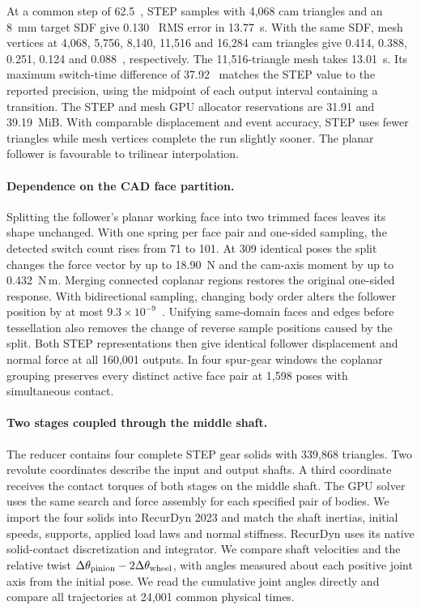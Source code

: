 At a common step of 62.5~\microsec{}, STEP samples with 4,068 cam triangles and an 8~mm target SDF give 0.130~\micron{} RMS error in 13.77~s. With the same SDF, mesh vertices at 4,068, 5,756, 8,140, 11,516 and 16,284 cam triangles give 0.414, 0.388, 0.251, 0.124 and 0.088~\micron{}, respectively. The 11,516-triangle mesh takes 13.01~s. Its maximum switch-time difference of 37.92~\microsec{} matches the STEP value to the reported precision, using the midpoint of each output interval containing a transition. The STEP and mesh GPU allocator reservations are 31.91 and 39.19~MiB. With comparable displacement and event accuracy, STEP uses fewer triangles while mesh vertices complete the run slightly sooner. The planar follower is favourable to trilinear interpolation.

\paragraph{Dependence on the CAD face partition.}
Splitting the follower's planar working face into two trimmed faces leaves its shape unchanged. With one spring per face pair and one-sided sampling, the detected switch count rises from 71 to 101. At 309 identical poses the split changes the force vector by up to 18.90~N and the cam-axis moment by up to 0.432~N\,m. Merging connected coplanar regions restores the original one-sided response. With bidirectional sampling, changing body order alters the follower position by at most $9.3\times10^{-9}$~\micron{}. Unifying same-domain faces and edges before tessellation also removes the change of reverse sample positions caused by the split. Both STEP representations then give identical follower displacement and normal force at all 160,001 outputs. In four spur-gear windows the coplanar grouping preserves every distinct active face pair at 1,598 poses with simultaneous contact.

\paragraph{Two stages coupled through the middle shaft.}
The reducer contains four complete STEP gear solids with 339,868 triangles. Two revolute coordinates describe the input and output shafts. A third coordinate receives the contact torques of both stages on the middle shaft. The GPU solver uses the same search and force assembly for each specified pair of bodies. We import the four solids into RecurDyn 2023 and match the shaft inertias, initial speeds, supports, applied load laws and normal stiffness. RecurDyn uses its native solid-contact discretization and integrator. We compare shaft velocities and the relative twist $\Delta\theta_{\rm pinion}-2\Delta\theta_{\rm wheel}$, with angles measured about each positive joint axis from the initial pose. We read the cumulative joint angles directly and compare all trajectories at 24,001 common physical times.

